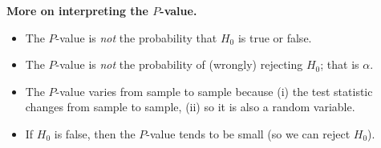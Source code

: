 \textbf{More on interpreting the $P$-value.}
\begin{itemize}
  \item The $P$-value is \emph{not} the probability that $H_0$ is true or false.
  \item The $P$-value is \emph{not} the probability of (wrongly) rejecting $H_0$; that is $\alpha$.
  \item The $P$-value varies from sample to sample because (i) the test statistic changes from sample to sample, (ii) so it is also a random variable.
  \item If $H_0$ is false, then the $P$-value tends to be small (so we can reject $H_0$).
\end{itemize}
